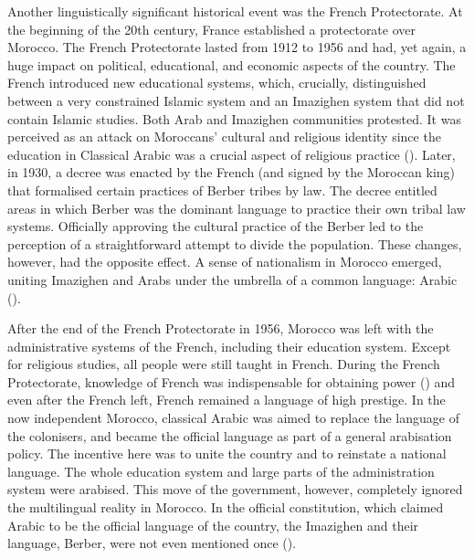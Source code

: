 Another linguistically significant historical event was the French Protectorate. At the beginning of the 20th century, France established a protectorate over Morocco. The French Protectorate lasted from 1912 to 1956 and had, yet again, a huge impact on political, educational, and economic aspects of the country. The French introduced new educational systems, which, crucially, distinguished between a very constrained Islamic system and an Imazighen system that did not contain Islamic studies. Both Arab and Imazighen communities protested. It was perceived as an attack on Moroccans' cultural and religious identity since the education in Classical Arabic was a crucial aspect of religious practice (\citealt{Zouhir2013}). Later, in 1930, a decree was enacted by the French (and signed by the Moroccan king) that formalised certain practices of Berber tribes by law. The decree entitled areas in which Berber was the dominant language to practice their own tribal law systems. Officially approving the cultural practice of the Berber led to the perception of a straightforward attempt to divide the population. These changes, however, had the opposite effect. A sense of nationalism in Morocco emerged, uniting Imazighen and Arabs under the umbrella of a common language: Arabic (\citealt{ElAissati2005}).

 
After the end of the French Protectorate in 1956, Morocco was left with the administrative systems of the French, including their education system. Except for religious studies, all people were still taught in French. During the French Protectorate, knowledge of French was indispensable for obtaining power (\citealt{Marley2004}) and even after the French left, French remained a language of high prestige. In the now independent Morocco, classical Arabic was aimed to replace the language of the colonisers, and became the official language as part of a general arabisation policy. The incentive here was to unite the country and to reinstate a national language. The whole education system and large parts of the administration system were arabised. This move of the government, however, completely ignored the multilingual reality in Morocco. In the official constitution, which claimed Arabic to be the official language of the country, the Imazighen and their language, Berber, were not even mentioned once (\citealt{ElAissati2005}). 

